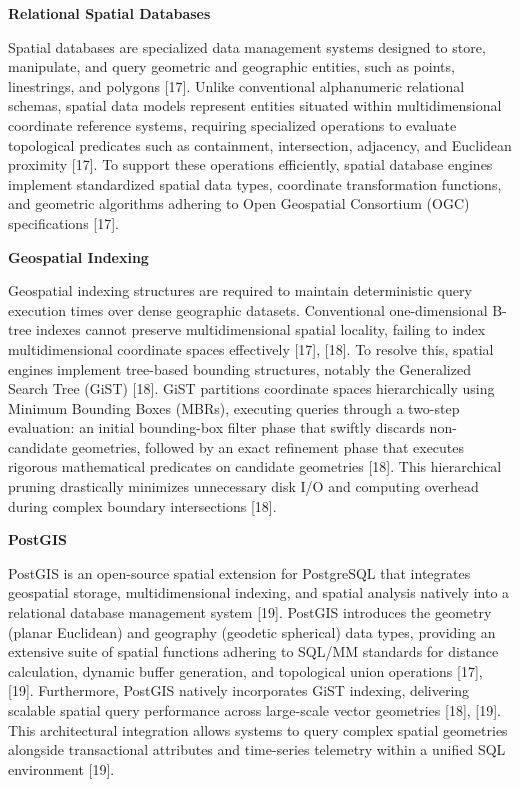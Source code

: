 \documentclass[12pt]{article}
\newcommand{\infofont}{\fontsize{16pt}{19.2pt}\selectfont}
\newcommand{\MinorHead}[1]{\vspace{0.6em}\noindent{\infofont\bfseries #1}\vspace{0.2em}\par}
\begin{document}
\MinorHead{2.1.3.3 Spatial Database}

\textbf{\infofont Relational Spatial Databases}\par
\infofont
Spatial databases are specialized data management systems designed to store,
manipulate, and query geometric and geographic entities, such as points, linestrings, and
polygons [17]. Unlike conventional alphanumeric relational schemas, spatial data models
represent entities situated within multidimensional coordinate reference systems, requiring
specialized operations to evaluate topological predicates such as containment, intersection,
adjacency, and Euclidean proximity [17]. To support these operations efficiently, spatial
database engines implement standardized spatial data types, coordinate transformation
functions, and geometric algorithms adhering to Open Geospatial Consortium (OGC)
specifications [17].

\textbf{\infofont Geospatial Indexing}\par
\infofont
Geospatial indexing structures are required to maintain deterministic query execution
times over dense geographic datasets. Conventional one-dimensional B-tree indexes cannot
preserve multidimensional spatial locality, failing to index multidimensional coordinate
spaces effectively [17], [18]. To resolve this, spatial engines implement tree-based bounding
structures, notably the Generalized Search Tree (GiST) [18]. GiST partitions coordinate
spaces hierarchically using Minimum Bounding Boxes (MBRs), executing queries through a
two-step evaluation: an initial bounding-box filter phase that swiftly discards non-candidate
geometries, followed by an exact refinement phase that executes rigorous mathematical
predicates on candidate geometries [18]. This hierarchical pruning drastically minimizes
unnecessary disk I/O and computing overhead during complex boundary intersections [18].

\textbf{\infofont PostGIS}\par
\infofont
PostGIS is an open-source spatial extension for PostgreSQL that integrates geospatial
storage, multidimensional indexing, and spatial analysis natively into a relational database
management system [19]. PostGIS introduces the geometry (planar Euclidean) and
geography (geodetic spherical) data types, providing an extensive suite of spatial functions
adhering to SQL/MM standards for distance calculation, dynamic buffer generation, and
topological union operations [17], [19]. Furthermore, PostGIS natively incorporates GiST
indexing, delivering scalable spatial query performance across large-scale vector geometries
[18], [19]. This architectural integration allows systems to query complex spatial geometries
alongside transactional attributes and time-series telemetry within a unified SQL
environment [19].
\end{document}
